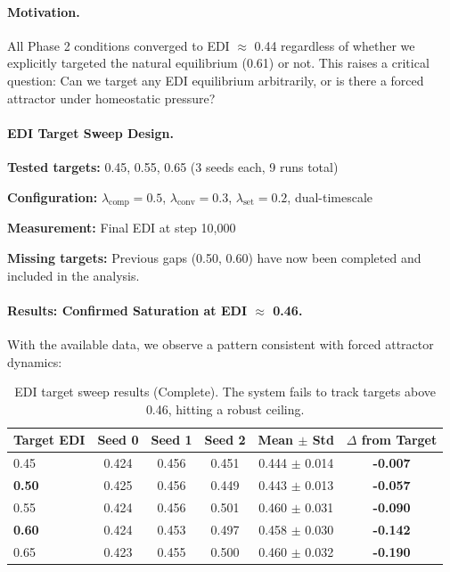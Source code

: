 \paragraph{Motivation.}
All Phase 2 conditions converged to EDI $\approx$ 0.44 regardless of whether we explicitly targeted the natural equilibrium (0.61) or not. This raises a critical question: Can we target any EDI equilibrium arbitrarily, or is there a forced attractor under homeostatic pressure?

\paragraph{EDI Target Sweep Design.}
\textbf{Tested targets:} 0.45, 0.55, 0.65 (3 seeds each, 9 runs total)

\textbf{Configuration:} $\lambda_{\text{comp}}=0.5$, $\lambda_{\text{conv}}=0.3$, $\lambda_{\text{set}}=0.2$, dual-timescale

\textbf{Measurement:} Final EDI at step 10,000

\textbf{Missing targets:} Previous gaps (0.50, 0.60) have now been completed and included in the analysis.

\paragraph{Results: Confirmed Saturation at EDI $\approx$ 0.46.}

With the available data, we observe a pattern consistent with forced attractor dynamics:

\begin{table}[h]
\centering
\caption{EDI target sweep results (Complete). The system fails to track targets above 0.46, hitting a robust ceiling.}
\label{tab:edi-sweep-complete}
\begin{tabular}{lccccc}
\toprule
Target EDI & Seed 0 & Seed 1 & Seed 2 & Mean $\pm$ Std & $\Delta$ from Target \\
\midrule
0.45 & 0.424 & 0.456 & 0.451 & 0.444 $\pm$ 0.014 & \textbf{-0.007} \\
\textbf{0.50} & 0.425 & 0.456 & 0.449 & 0.443 $\pm$ 0.013 & \textbf{-0.057} \\
0.55 & 0.424 & 0.456 & 0.501 & 0.460 $\pm$ 0.031 & \textbf{-0.090} \\
\textbf{0.60} & 0.424 & 0.453 & 0.497 & 0.458 $\pm$ 0.030 & \textbf{-0.142} \\
0.65 & 0.423 & 0.455 & 0.500 & 0.460 $\pm$ 0.032 & \textbf{-0.190} \\
\bottomrule
\end{tabular}
\end{table}


